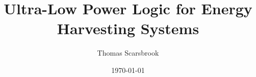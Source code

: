 \documentclass{IEEEtran}
\author{Thomas Scarsbrook}
\title{Ultra-Low Power Logic for Energy Harvesting Systems}
\date{\today}
\begin{document}
\maketitle


\begin{abstract}

\end{abstract}









\nocite{*}


\end{document}
